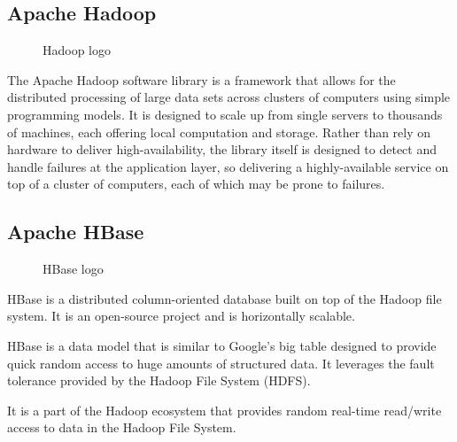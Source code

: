 \documentclass[oneside,a4paper,12pt]{report}
\begin{document}
{ \subsection{Apache Hadoop}
 \begin{figure}[h]
 	\begin{center}
 	\end{center}
 	\caption{Hadoop logo}
 \end{figure} 
 The Apache Hadoop software library is a framework that allows for the distributed processing of large data sets across clusters of computers using simple programming models. It is designed to scale up from single servers to thousands of machines, each offering local computation and storage. Rather than rely on hardware to deliver high-availability, the library itself is designed to detect and handle failures at the application layer, so delivering a highly-available service on top of a cluster of computers, each of which may be prone to failures.

\subsection{Apache HBase}
 \begin{figure}[h]
 	\begin{center}
 	\end{center}
 	\caption{HBase logo}
 \end{figure} 
HBase is a distributed column-oriented database built on top of the Hadoop file system. It is an open-source project and is horizontally scalable.

HBase is a data model that is similar to Google’s big table designed to provide quick random access to huge amounts of structured data. It leverages the fault tolerance provided by the Hadoop File System (HDFS).

It is a part of the Hadoop ecosystem that provides random real-time read/write access to data in the Hadoop File System.

}
\end{document}
